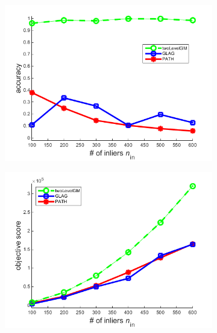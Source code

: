 \begin{figure}[h] 
		\begin{subfigure}[b]{0.3\textwidth}
			\centering
			\includegraphics[scale=0.25]{"chapter3/fig/SyntheticTest_BigGraphs/descr/Results_v4.3.3/Test3/accuracy_avg1t"} 
		\end{subfigure}
		\begin{subfigure}[b]{0.3\textwidth}
			\centering
			\includegraphics[scale=0.25]{"chapter3/fig/SyntheticTest_BigGraphs/descr/Results_v4.3.3/Test3/score_avg1t"} 
		\end{subfigure} 
		\begin{subfigure}[b]{0.3\textwidth}
			\centering

\end{subfigure}
\end{figure}
